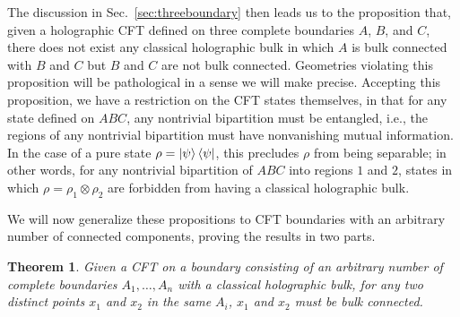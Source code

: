 \documentclass[12pt,english]{article}
\newtheorem{theorem}{Theorem}
\newcommand{\Sec}[1]{Sec.~\ref{#1}}
\begin{document}
The discussion in \Sec{sec:threeboundary} then leads us to the proposition that, given a holographic CFT defined on three complete boundaries $A$, $B$, and $C$, there does not exist any classical holographic bulk in which $A$ is bulk connected with $B$ and $C$ but $B$ and $C$ are not bulk connected. Geometries violating this proposition will be pathological in a sense we will make precise. Accepting this proposition, we have a restriction on the CFT states themselves, in that for any state defined on $ABC$, any nontrivial bipartition must be entangled, i.e., the regions of any nontrivial bipartition must have nonvanishing mutual information. In the case of a pure state $\rho=\ket{\psi}\bra{\psi}$, this precludes $\rho$ from being separable; in other words, for any nontrivial bipartition of $ABC$ into regions $1$ and $2$, states in which $\rho = \rho_{1} \otimes \rho_{2}$ are forbidden from having a classical holographic bulk. 

We will now generalize these propositions to CFT boundaries with an arbitrary number of connected components, proving the results in two parts.

\begin{theorem}\label{thm:geometry} Given a CFT on a boundary consisting of an arbitrary number of complete boundaries $A_1,\ldots,A_n$ with a classical holographic bulk, for any two distinct points $x_1$ and $x_2$ in the same $A_i$, $x_1$ and $x_2$ must be bulk connected.
\end{theorem}
\end{document}
